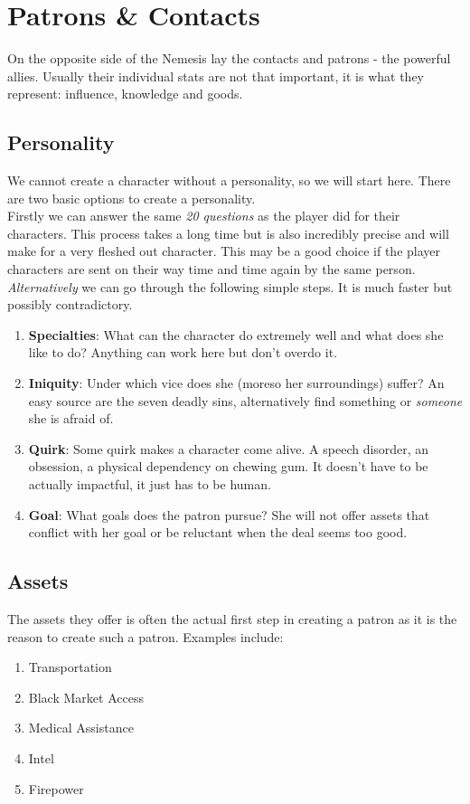 \documentclass[12pt,a4paper,openany,usenames,dvipsnames]{book}
\begin{document}
	\chapter{Patrons \& Contacts}
	On the opposite side of the Nemesis lay the contacts and patrons - the powerful allies. Usually their individual stats are not that important, it is what they represent: influence, knowledge and goods.
	\section*{Personality}
	We cannot create a character without a personality, so we will start here. There are two basic options to create a personality.\\
	Firstly we can answer the same \emph{20 questions} as the player did for their characters. This process takes a long time but is also incredibly precise and will make for a very fleshed out character. This may be a good choice if the player characters are sent on their way time and time again by the same person.
	\emph{Alternatively} we can go through the following simple steps. It is much faster but possibly contradictory.
	\begin{enumerate}
		\setlength\itemsep{-8mm} \vspace{-8mm}
		\item \textbf{Specialties}: What can the character do extremely well and what does she like to do? Anything can work here but don't overdo it.
		\item \textbf{Iniquity}: Under which vice does she (moreso her surroundings) suffer? An easy source are the seven deadly sins, alternatively find something or \emph{someone} she is afraid of.
		\item \textbf{Quirk}: Some quirk makes a character come alive. A speech disorder, an obsession, a physical dependency on chewing gum. It doesn't have to be actually impactful, it just has to be human.
		\item \textbf{Goal}: What goals does the patron pursue? She will not offer assets that conflict with her goal or be reluctant when the deal seems too good.
	\end{enumerate}
	\section*{Assets}
	The assets they offer is often the actual first step in creating a patron as it is the reason to create such a patron. Examples include:
	\begin{enumerate}
		\setlength\itemsep{-8mm} \vspace{-8mm}
		\item Transportation
		\item Black Market Access
		\item Medical Assistance
		\item Intel
		\item Firepower
	\end{enumerate}
\end{document}
